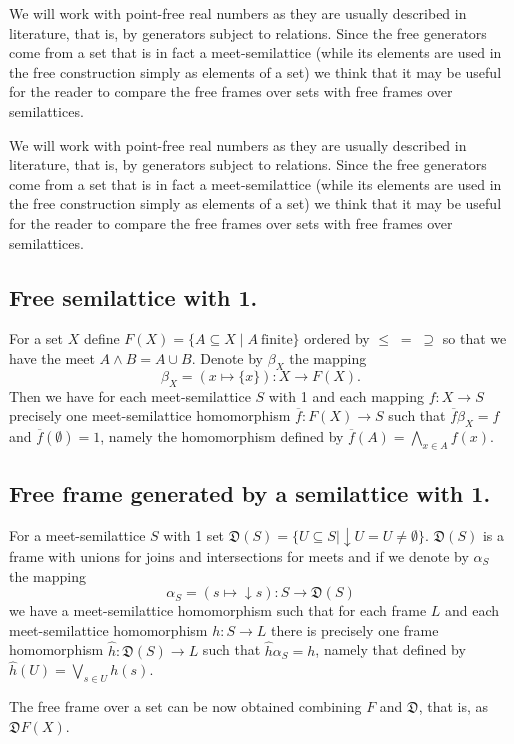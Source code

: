 We will work with point-free real numbers as they are usually described in literature, that is, by generators subject to relations. Since the free generators come from a set that is in fact a meet-semilattice (while its elements are used in the free construction simply as elements of a set) we think that it may be useful for the reader to compare the free frames over sets with free frames over semilattices.

We will work with point-free real numbers as they are usually described in literature, that is, by generators subject to relations. Since the free generators come from a set that is in fact a meet-semilattice (while its elements are used in the free construction simply as elements of a set) we think that it may be useful for the reader to compare the free frames over sets with free frames over semilattices.



\subsection{Free semilattice with 1.} For a set $X$ define
$
F(X)=\{A\subseteq X\mid A\ \text{finite}\}
$
ordered by $\leq\;=\;\supseteq$ so that we have the meet $A\wedge B=A\cup B$. Denote by $\beta_X$ the mapping
$$
\beta_X=(x\mapsto\{x\})\colon X\to F(X).
$$
 Then we have for each meet-semilattice $S$ with 1 and each mapping $f\colon X\to S$ precisely one meet-semilattice homomorphism $\overline{f}\colon F(X)\to S$ such that $\overline{f}\beta_X=f$ and $\overline{f}(\emptyset)=1$, namely the homomorphism defined by $\overline{f}(A)=\bigwedge_{x\in A} f(x)$.

\subsection{Free frame generated by a semilattice with 1.} For a meet-semilattice  $S$ with 1  set
$
{\mathfrak D}(S)=\{U\subseteq S\mid\downarrow\! U=U\neq \emptyset\}.
$
${\mathfrak D}(S)$ is a frame with unions for joins and intersections for meets and if we denote by $\alpha_S$ the mapping
$$
\alpha_S=(s\mapsto\downarrow\! s)\colon S\to {\mathfrak D}(S)
$$
we have a meet-semilattice homomorphism such that for each frame $L$ and each meet-semilattice homomorphism $h\colon S\to L$ there is precisely one frame  homomorphism $\widehat h\colon {\mathfrak D}(S)\to L$ such that $\widehat h\alpha_S=h$, namely that defined by $\widehat h(U)=\bigvee_{s\in U}h(s)$.

The free frame over a set can be now obtained combining $F$ and $\mathfrak D$, that is, as $\mathfrak{D}F(X)$.

